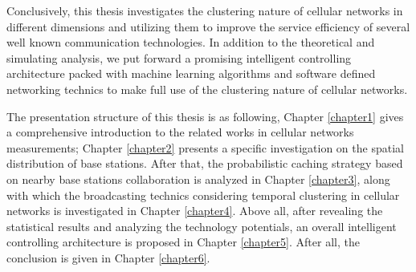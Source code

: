 Conclusively, this thesis investigates the clustering nature of cellular networks in different dimensions and utilizing them to improve the service efficiency of several well known communication technologies. In addition to the theoretical and simulating analysis, we put forward a promising intelligent controlling architecture packed with machine learning algorithms and software defined networking technics to make full use of the clustering nature of cellular networks.

The presentation structure of this thesis is as following, Chapter \ref{chapter1} gives a comprehensive introduction to the related works in cellular networks measurements; Chapter \ref{chapter2} presents a specific investigation on the spatial distribution of base stations. After that, the probabilistic caching strategy based on nearby base stations collaboration is analyzed in Chapter \ref{chapter3}, along with which the broadcasting technics considering temporal clustering in cellular networks is investigated in Chapter \ref{chapter4}. Above all, after revealing the statistical results and analyzing the technology potentials, an overall intelligent controlling architecture is proposed in Chapter \ref{chapter5}. After all, the conclusion is given in Chapter \ref{chapter6}.





